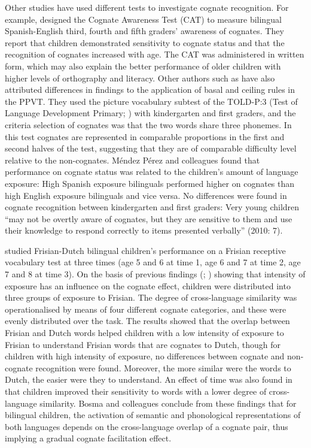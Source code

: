 \documentclass[output=paper,modfonts,nonflat,newtxmath]{langsci/langscibook}
\begin{document}
Other studies have used different tests to investigate cognate recognition. For example, \citet{MalabongaEtAl2008} designed the Cognate Awareness Test (CAT) to measure bilingual Spanish-English third, fourth and fifth graders’ awareness of cognates. They report that children demonstrated sensitivity to cognate status and that the recognition of cognates increased with age. The CAT was administered in written form, which may also explain the better performance of older children with higher levels of orthography and literacy. Other authors such as \citet{MendezPerezEtAl2010} have also attributed differences in findings to the application of basal and ceiling rules in the PPVT. They used the picture vocabulary subtest of the TOLD-P:3 (Test of Language Development Primary; \citealt{NewcomerHammill1997}) with kindergarten and first graders, and the criteria selection of cognates was that the two words share three phonemes. In this test cognates are represented in comparable proportions in the first and second halves of the test, suggesting that they are of comparable difficulty level relative to the non-cognates. Méndez Pérez and colleagues found that performance on cognate status was related to the children’s amount of language exposure: High Spanish exposure bilinguals performed higher on cognates than high English exposure bilinguals and vice versa. No differences were found in cognate recognition between kindergarten and first graders: Very young children “may not be overtly aware of cognates, but they are sensitive to them and use their knowledge to respond correctly to items presented verbally” (2010: 7).

 {\citet{BosmaEtAl2019} studied Frisian-Dutch bilingual children’s performance on a Frisian receptive vocabulary test at three times (age 5 and 6 at time 1, age 6 and 7 at time 2, age 7 and 8 at time 3). On the basis of previous findings (\citealt{MendezPerezEtAl2010}; \citealt{Dijkstra2013}) showing that intensity of exposure has an influence on the cognate effect, children were distributed into three groups of exposure to Frisian. The degree of cross-language similarity was operationalised by means of four different cognate categories, and these were evenly distributed over the task. The results showed that the overlap between Frisian and Dutch words helped children with a low intensity of exposure to Frisian to understand Frisian words that are cognates to Dutch, though for children with high intensity of exposure, no differences between cognate and non-cognate recognition were found. Moreover, the more similar were the words to Dutch, the easier were they to understand. An effect of time was also found in that children improved their sensitivity to words with a lower degree of cross-language similarity. Bosma and colleagues conclude from these findings that for bilingual children, the activation of semantic and phonological representations of both languages depends on the cross-language overlap of a cognate pair, thus implying a gradual cognate facilitation effect.}
\end{document}
